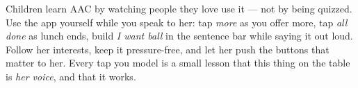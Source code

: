 \documentclass[10.5pt]{article}
\newcommand{\sub}[1]{\par\vspace{7pt}{\dispmed\small #1}\par\vspace{1pt}}
\begin{document}
\vspace{10pt}
\sub{The one habit that matters most: model it}
Children learn AAC by watching people they love use it — not by being quizzed. Use the
app yourself while you speak to her: tap \emph{more} as you offer more, tap \emph{all
done} as lunch ends, build \emph{I want ball} in the sentence bar while saying it out
loud. Follow her interests, keep it pressure-free, and let her push the buttons that
matter to her. Every tap you model is a small lesson that this thing on the table is
\emph{her voice}, and that it works.

\vspace{14pt}
\begin{center}
\end{center}
\end{document}
